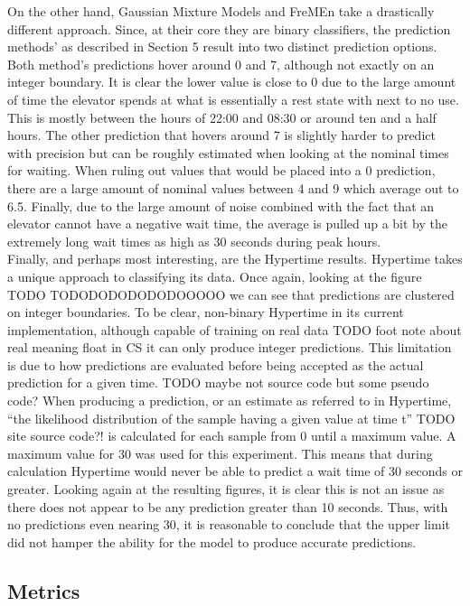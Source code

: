 On the other hand, Gaussian Mixture Models and FreMEn take a drastically
different approach. Since, at their core they are binary classifiers, the
prediction methods' as described in Section 5 result into two distinct
prediction options. Both method's predictions hover around 0 and 7, although
not exactly on an integer boundary. It is clear the lower value is close to 0
due to the large amount of time the elevator spends at what is essentially a
rest state with next to no use. This is mostly between the hours of 22:00 and
08:30 or around ten and a half hours. The other prediction that hovers around 7
is slightly harder to predict with precision but can be roughly estimated when
looking at the nominal times for waiting. When ruling out values that would be
placed into a 0 prediction, there are a large amount of nominal values between 4
and 9 which average out to 6.5. Finally, due to the large amount of noise
combined with the fact that an elevator cannot have a negative wait time,
the average is pulled up a bit by the extremely long wait times as high as 30 seconds during peak hours. \\

Finally, and perhaps most interesting, are the Hypertime results. Hypertime takes a
unique approach to classifying its data. Once again, looking at the figure TODO TODODODODODODOOOOO
we can see that predictions are clustered on integer boundaries. To be clear,
non-binary Hypertime in its current implementation, although capable of training
on real data TODO foot note about real meaning float in CS it can only produce
integer predictions. This limitation is due to how predictions are evaluated
before being accepted as the actual prediction for a given time. TODO maybe
not source code but some pseudo code? When producing a prediction, or an
estimate as referred to in Hypertime, ``the likelihood distribution of the
sample having a given value at time t'' TODO site source code?! is calculated
for each sample from 0 until a maximum value. A maximum value for 30 was used
for this experiment. This means that during calculation Hypertime would never
be able to predict a wait time of 30 seconds or greater. Looking again at the
resulting figures, it is clear this is not an issue as there does not appear to
be any prediction greater than 10 seconds. Thus, with no predictions even
nearing 30, it is reasonable to conclude that the upper limit did not hamper the ability for
the model to produce accurate predictions. \\

\subsection{ Metrics }

